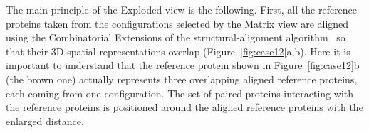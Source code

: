 \documentclass{bmcart}
\def\ExpView {Exploded view\xspace}
\def\MatView {Matrix view\xspace}
\begin{document}


The main principle of the \ExpView is the following.
First, all the reference proteins taken from the configurations selected by the \MatView are aligned using the Combinatorial Extensions of the structural-alignment algorithm~\cite{Shindyalov1998} so that their 3D spatial representations overlap (Figure~\ref{fig:case12}a,b). 
Here it is important to understand that the reference protein shown in Figure~\ref{fig:case12}b (the brown one) actually represents three overlapping aligned reference proteins, each coming from one configuration.
The set of paired proteins interacting with the reference proteins is positioned around the aligned reference proteins with the enlarged distance.

\end{document}
